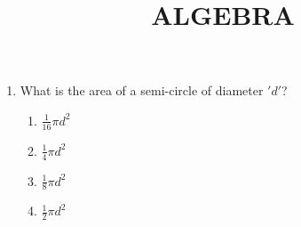 \documentclass{article}
\begin{document}
\begin{center}
\title{ALGEBRA}
\date{}
\maketitle
\end{center}
\begin{enumerate}

    \item What is the area of a semi-circle of diameter $'d'$?
    
    \begin{enumerate}
        \item $\frac{1}{16}\pi d^2$ \item $\frac{1}{4}\pi d^2$ \item $\frac{1}{8}\pi d^2$ \item $\frac{1}{2}\pi d^2$
    \end{enumerate}


\end{enumerate}
\end{document}
